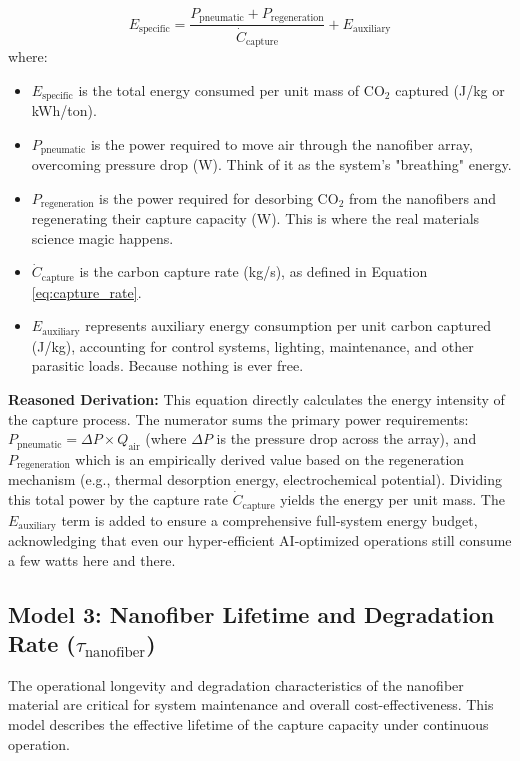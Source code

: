 \documentclass[12pt]{article}
\begin{document}
\begin{equation}
E_{\text{specific}} = \frac{P_{\text{pneumatic}} + P_{\text{regeneration}}}{\dot{C}_{\text{capture}}} + E_{\text{auxiliary}}
\label{eq:energy_specific}
\end{equation}
where:
\begin{itemize}
    \item \(E_{\text{specific}}\) is the total energy consumed per unit mass of CO\(_2\) captured (J/kg or kWh/ton).
    \item \(P_{\text{pneumatic}}\) is the power required to move air through the nanofiber array, overcoming pressure drop (W). Think of it as the system's "breathing" energy.
    \item \(P_{\text{regeneration}}\) is the power required for desorbing CO\(_2\) from the nanofibers and regenerating their capture capacity (W). This is where the real materials science magic happens.
    \item \(\dot{C}_{\text{capture}}\) is the carbon capture rate (kg/s), as defined in Equation \ref{eq:capture_rate}.
    \item \(E_{\text{auxiliary}}\) represents auxiliary energy consumption per unit carbon captured (J/kg), accounting for control systems, lighting, maintenance, and other parasitic loads. Because nothing is ever free.
\end{itemize}

\textbf{Reasoned Derivation:} This equation directly calculates the energy intensity of the capture process. The numerator sums the primary power requirements: \(P_{\text{pneumatic}} = \Delta P \times Q_{\text{air}}\) (where \(\Delta P\) is the pressure drop across the array), and \(P_{\text{regeneration}}\) which is an empirically derived value based on the regeneration mechanism (e.g., thermal desorption energy, electrochemical potential). Dividing this total power by the capture rate \(\dot{C}_{\text{capture}}\) yields the energy per unit mass. The \(E_{\text{auxiliary}}\) term is added to ensure a comprehensive full-system energy budget, acknowledging that even our hyper-efficient AI-optimized operations still consume a few watts here and there.

\subsection*{Model 3: Nanofiber Lifetime and Degradation Rate (\(\tau_{\text{nanofiber}}\))}
The operational longevity and degradation characteristics of the nanofiber material are critical for system maintenance and overall cost-effectiveness. This model describes the effective lifetime of the capture capacity under continuous operation.
\end{document}
